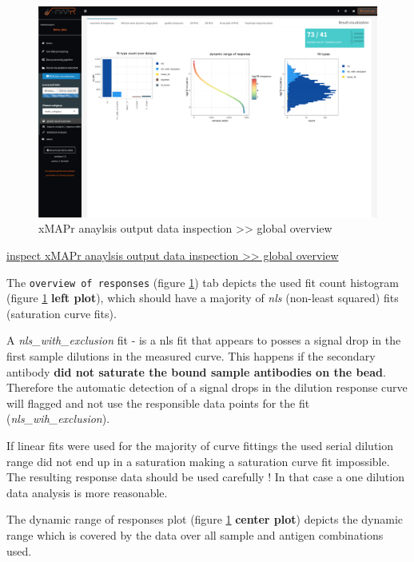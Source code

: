 \documentclass[
]{book}
\begin{document}
\begin{figure}

{\centering \includegraphics[width=50.5in]{figures/global_result_overview} 

}

\caption{xMAPr anaylsis output data inspection >> global overview}\label{fig:globalResultOverview}
\end{figure}

\href{figures/global_result_overview.png}{inspect xMAPr anaylsis output data inspection \textgreater\textgreater{} global overview}

The \texttt{overview\ of\ responses} (figure \ref{fig:globalResultOverview}) tab depicts the used fit count histogram (figure \ref{fig:globalResultOverview} \textbf{left plot}), which should have a majority of \emph{nls} (non-least squared) fits (saturation curve fits).

A \emph{nls\_with\_exclusion} fit - is a nls fit that appears to posses a signal drop in the first sample dilutions in the measured curve. This happens if the secondary antibody \textbf{did not saturate the bound sample antibodies on the bead}. Therefore the automatic detection of a signal drops in the dilution response curve will flagged and not use the responsible data points for the fit (\emph{nls\_wih\_exclusion}).

If linear fits were used for the majority of curve fittings the used serial dilution range did not end up in a saturation making a saturation curve fit impossible. The resulting response data should be used carefully ! In that case a one dilution data analysis is more reasonable.

The dynamic range of responses plot (figure \ref{fig:globalResultOverview} \textbf{center plot}) depicts the dynamic range which is covered by the data over all sample and antigen combinations used.
\end{document}
